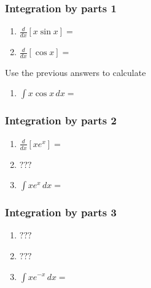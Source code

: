 \documentclass[14pt]{beamer}
\begin{document}
\begin{frame}[t]
	\frametitle{Integration by parts 1}

	\begin{enumerate}
		\item $\displaystyle \frac{d}{dx}\left[ x \sin x \right] =$
			\vspace{.1cm}
			\vspace{.1cm}

		\item $\displaystyle \frac{d}{dx}\left[ \cos x \right] =$
			\vspace{.1cm}
			\vspace{.1cm}
	\end{enumerate}
	\vspace{.1cm}
	\vspace{.1cm}
	Use the previous answers to calculate
	\vspace{.1cm}
	\vspace{.1cm}
	\begin{enumerate}
		\addtocounter{enumi}{2}

		\item $\displaystyle \int x \cos x \, dx =$
	\end{enumerate}
\end{frame}

\begin{frame}[t]
	\frametitle{Integration by parts 2}

	\begin{enumerate}
		\item $\displaystyle \frac{d}{dx}\left[ x e^{x}\right] =$
			\vspace{.5cm}

		\item $\displaystyle ???$
			\vspace{.5cm}

		\item $\displaystyle \int x e^{x}\, dx =$
	\end{enumerate}
\end{frame}

\begin{frame}[t]
	\frametitle{Integration by parts 3}

	\begin{enumerate}
		\item $\displaystyle ???$
			\vspace{.3cm}

		\item $\displaystyle ???$
			\vspace{.3cm}

		\item $\displaystyle \int x e^{-x}\, dx =$
	\end{enumerate}
\end{frame}
\end{document}
